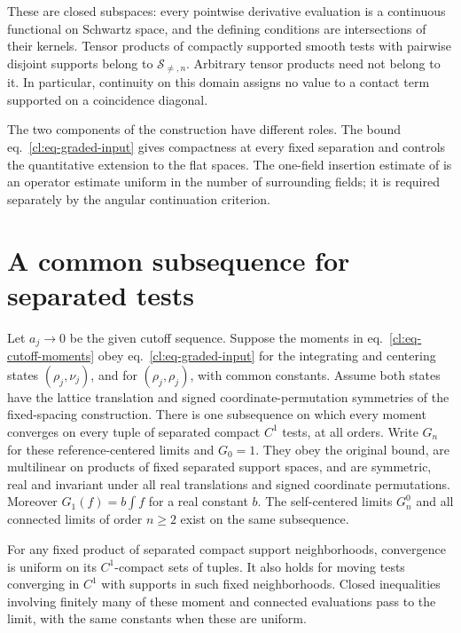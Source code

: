 \documentclass[11pt,letterpaper,reqno]{amsart}
\makeatletter
\numberwithin{equation}{section}
\renewcommand{\eqref}[1]{\textup{eq.~\ref{#1}}}
\theoremstyle{definition}
\newcommand{\ms@minorstart}{%
  \pushQED{\qed}\renewcommand{\qedsymbol}{$\blacksquare$}}
\newenvironment{proposition}[1][]{\ms@minorstart\ms@proposition[#1]}
  {\popQED\endms@proposition}
\theoremstyle{remark}
\makeatother
\begin{document}
These are closed subspaces: every pointwise derivative
evaluation is a continuous functional on Schwartz
space, and the defining conditions are intersections
of their kernels. Tensor products of compactly supported
smooth tests with pairwise disjoint supports belong to
\(\mathcal S_{\ne,n}\). Arbitrary tensor products need
not belong to it. In particular, continuity on this
domain assigns no value to a contact term supported
on a coincidence diagonal.

The two components of the construction have different
roles. The bound \eqref{cl:eq-graded-input} gives
compactness at every fixed separation and controls
the quantitative extension to the flat spaces.
The one-field insertion estimate of \cite[Theorem~C]{SI}
is an operator estimate uniform in the number of
surrounding fields; it is required separately by
the angular continuation criterion.


\section{A common subsequence for separated tests}
\label{cl:sec-compactness}

\begin{proposition}[Separated compactness]\label{cl:prop-separated-compactness}
Let \(a_j\to0\) be the given cutoff sequence. Suppose the moments
in \eqref{cl:eq-cutoff-moments} obey \eqref{cl:eq-graded-input} for
the integrating and centering states \((\rho_j,\nu_j)\), and for
\((\rho_j,\rho_j)\), with common constants. Assume both states
have the lattice translation and signed coordinate-permutation
symmetries of the fixed-spacing construction.
There is one subsequence on which every moment converges on every
tuple of separated compact \(C^1\) tests, at all orders.
Write \(G_n\) for these reference-centered limits and \(G_0=1\).
They obey the original bound, are multilinear on products of
fixed separated support spaces, and are symmetric, real and
invariant under all real translations and signed coordinate
permutations. Moreover \(G_1(f)=b\int f\) for a real constant \(b\).
The self-centered limits \(G_n^0\) and all connected limits of
order \(n\ge2\) exist on the same subsequence.

For any fixed product of separated compact support neighborhoods,
convergence is uniform on its \(C^1\)-compact sets of tuples.
It also holds for moving tests converging in \(C^1\) with supports
in such fixed neighborhoods. Closed inequalities involving
finitely many of these moment and connected evaluations pass
to the limit, with the same constants when these are uniform.
\end{proposition}
\end{document}
